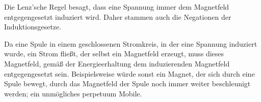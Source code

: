 Die Lenz'sche Regel besagt, dass eine Spannung immer dem Magnetfeld entgegengesetzt induziert wird. Daher stammen auch die Negationen der Induktionsgesetze.

Da eine Spule in einem geschlossenen Stromkreis, in der eine Spannung induziert wurde, ein Strom fließt, der selbst ein Magnetfeld erzeugt, muss dieses Magnetfeld, gemäß der Energieerhaltung dem induzierenden Magnetfeld entgegengesetzt sein. Beispielsweise würde sonst ein Magnet, der sich durch eine Spule bewegt, durch das Magnetfeld der Spule noch immer weiter beschleunigt werden; ein unmögliches perpetuum Mobile.
